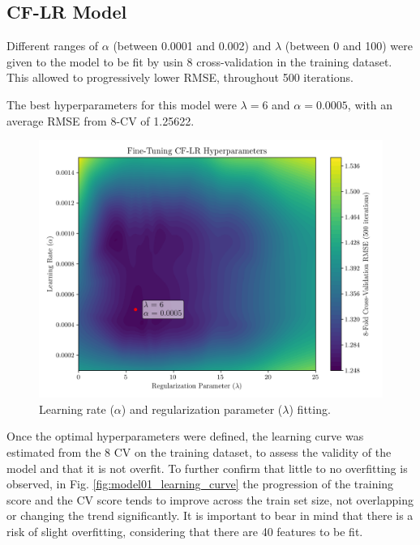\documentclass[conference]{IEEEtran}
\begin{document}
\subsection{CF-LR Model}

Different ranges of $\alpha$ (between 0.0001 and 0.002) and $\lambda$ (between 0 and 100) were given to the model to be fit by usin 8 cross-validation in the training dataset. This allowed to progressively lower RMSE, throughout 500 iterations.

The best hyperparameters for this model were $\lambda = 6$ and $\alpha = 0.0005$, with an average RMSE from 8-CV of 1.25622.

\begin{figure}[H]
    \centering
    \includegraphics[width=1\linewidth]{assets/model01_hyperparametres.png}
    \caption{Learning rate ($\alpha$) and regularization parameter ($\lambda$) fitting.}
    \label{fig:model01_hyperparametres}
\end{figure}

Once the optimal hyperparameters were defined, the learning curve was estimated from the 8 CV on the training dataset, to assess the validity of the model and that it is not overfit. To further confirm that little to no overfitting is observed, in Fig. \ref{fig:model01_learning_curve} the progression of the training score and the CV score tends to improve across the train set size, not overlapping or changing the trend significantly. It is important to bear in mind that there is a risk of slight overfitting, considering that there are 40 features to be fit.
\end{document}
